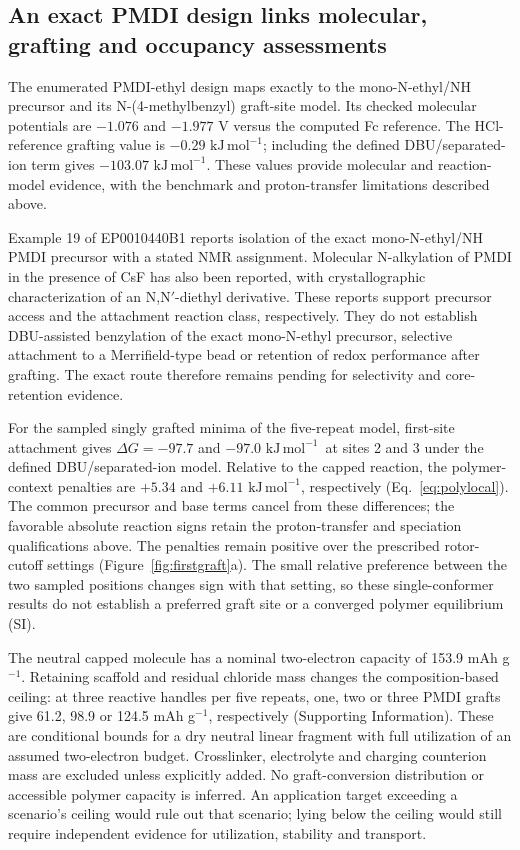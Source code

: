 \documentclass[11pt]{article}
\newcommand{\kj}{\ensuremath{\mathrm{kJ\,mol^{-1}}}}
\begin{document}
\subsection{An exact PMDI design links molecular, grafting and occupancy assessments}
The enumerated PMDI-ethyl design maps exactly to the mono-N-ethyl/NH precursor and its N-(4-methylbenzyl) graft-site model. Its checked molecular potentials are $-1.076$ and $-1.977$ V versus the computed Fc reference. The HCl-reference grafting value is $-0.29$ \kj; including the defined DBU/separated-ion term gives $-103.07$ \kj. These values provide molecular and reaction-model evidence, with the benchmark and proton-transfer limitations described above.

Example 19 of EP0010440B1 reports isolation of the exact mono-N-ethyl/NH PMDI precursor with a stated NMR assignment.\cite{bochis1983} Molecular N-alkylation of PMDI in the presence of CsF has also been reported, with crystallographic characterization of an N,N$'$-diethyl derivative.\cite{hamilton1998} These reports support precursor access and the attachment reaction class, respectively. They do not establish DBU-assisted benzylation of the exact mono-N-ethyl precursor, selective attachment to a Merrifield-type bead or retention of redox performance after grafting. The exact route therefore remains pending for selectivity and core-retention evidence.

For the sampled singly grafted minima of the five-repeat model, first-site attachment gives $\Delta G=-97.7$ and $-97.0$ \kj\ at sites 2 and 3 under the defined DBU/separated-ion model. Relative to the capped reaction, the polymer-context penalties are $+5.34$ and $+6.11$ \kj, respectively (Eq.~\ref{eq:polylocal}). The common precursor and base terms cancel from these differences; the favorable absolute reaction signs retain the proton-transfer and speciation qualifications above. The penalties remain positive over the prescribed rotor-cutoff settings (Figure~\ref{fig:firstgraft}a). The small relative preference between the two sampled positions changes sign with that setting, so these single-conformer results do not establish a preferred graft site or a converged polymer equilibrium (SI).

The neutral capped molecule has a nominal two-electron capacity of 153.9 mAh g$^{-1}$. Retaining scaffold and residual chloride mass changes the composition-based ceiling: at three reactive handles per five repeats, one, two or three PMDI grafts give 61.2, 98.9 or 124.5 mAh g$^{-1}$, respectively (Supporting Information). These are conditional bounds for a dry neutral linear fragment with full utilization of an assumed two-electron budget. Crosslinker, electrolyte and charging counterion mass are excluded unless explicitly added. No graft-conversion distribution or accessible polymer capacity is inferred. An application target exceeding a scenario's ceiling would rule out that scenario; lying below the ceiling would still require independent evidence for utilization, stability and transport.
\end{document}
